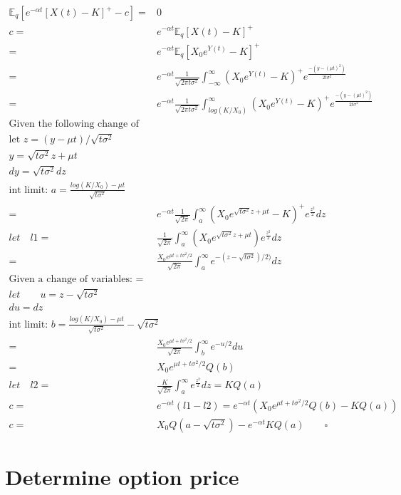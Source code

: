 \documentclass[]{article}
\begin{document}
\begin{align}
\mathbb{E}_q[e^{-\alpha t }[X(t)-K]^+-c]=&0\\
c =& e^{-\alpha t } \mathbb{E}_q[X(t)-K]^+\\
=& e^{-\alpha t } \mathbb{E}_q[X_0e^{Y(t)}-K]^+\\
=& e^{-\alpha t } \frac{1}{\sqrt{2\pi t \sigma^2}}\int_{-\infty}^{\infty} (X_0e^{Y(t)}-K)^+e^{\frac{-(y-(\mu t)^2)}{2t\sigma^2}}\\
=& e^{-\alpha t } \frac{1}{\sqrt{2\pi t \sigma^2}}\int_{log(K/X_0)}^{\infty} (X_0e^{Y(t)}-K)^+e^{\frac{-(y-(\mu t)^2)}{2t\sigma^2}}\\
\text{Given the following change of variabeles:}&\\
\text{let } z =  (y - \mu t)/\sqrt{t\sigma^2}&\\
y = \sqrt{t\sigma^2}z + \mu t&\\
dy = \sqrt{t\sigma^2}dz&\\
\text{int limit: } a = \frac{log(K/X_0)-\mu t}{\sqrt{t\sigma^2}}&\\
=& e^{-\alpha t } \frac{1}{\sqrt{2\pi}}\int_{a}^{\infty} (X_0e^{\sqrt{t\sigma^2}z + \mu t}-K)^+e^{\frac{z^2}{2}}dz\\
let \quad l1 =& \frac{1}{\sqrt{2\pi}}\int_{a}^{\infty} (X_0e^{\sqrt{t\sigma^2}z + \mu t})e^{\frac{z^2}{2}}dz\\
=& \frac{X_0e^{\mu t+t\sigma^2/2}}{\sqrt{2\pi}}\int_{a}^{\infty} e^{-(z-\sqrt{t\sigma^2})/2)}dz\\
\text{Given a change of variables: }=& \\
let \qquad u = z-\sqrt{t\sigma^2}&\\
du = dz&\\
\text{int limit: } b = \frac{log(K/X_0)-\mu t}{\sqrt{t\sigma^2}} - \sqrt{t\sigma^2}&\\
=& \frac{X_0e^{\mu t+t\sigma^2/2}}{\sqrt{2\pi}}\int_{b}^{\infty} e^{-u/2}du\\
=&X_0e^{\mu t+t\sigma^2/2}Q(b)\\
let \quad l2 =&\frac{K}{\sqrt{2\pi}}\int_{a}^{\infty}e^{\frac{z^2}{2}}dz = KQ(a)\\
c =& e^{-\alpha t }(l1-l2) = e^{-\alpha t }(X_0e^{\mu t+t\sigma^2/2}Q(b) - KQ(a))\\
c=& X_0Q(a - \sqrt{t \sigma^2}) - e^{-\alpha t }KQ(a) \qquad \square
\end{align}

\section{Determine option price}
\end{document}
